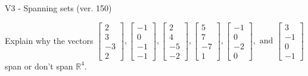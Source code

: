 \begin{exercise}
  \begin{exerciseTitle}V3 - Spanning sets (ver. 150)\end{exerciseTitle}
  \begin{exerciseStatement}
    Explain why the vectors \(\left[\begin{array}{r}
2 \\
3 \\
-3 \\
2
\end{array}\right] , \left[\begin{array}{r}
-1 \\
0 \\
-1 \\
-1
\end{array}\right] , \left[\begin{array}{r}
2 \\
4 \\
-5 \\
-2
\end{array}\right] , \left[\begin{array}{r}
5 \\
7 \\
-7 \\
1
\end{array}\right] , \left[\begin{array}{r}
-1 \\
0 \\
-2 \\
0
\end{array}\right] , \text{ and } \left[\begin{array}{r}
3 \\
-1 \\
0 \\
-1
\end{array}\right]\) span or don't span \(\mathbb{R}^4\). 
	



\end{exerciseStatement}
\end{exercise}
